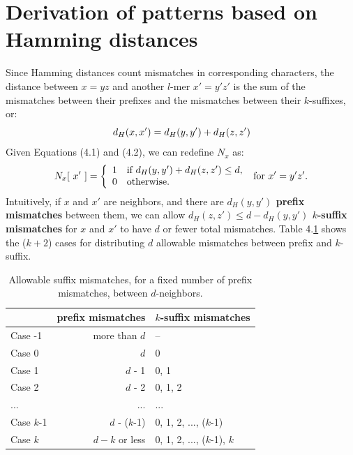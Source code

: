 \documentclass[oneside,12pt]{DISCSthesis}
\begin{document}
	\section{Derivation of patterns based on Hamming distances}
		\noindent Since Hamming distances count mismatches in corresponding characters, the distance between $x = yz$ and another $l$-mer $x' = y'z'$ is the sum of the mismatches between their prefixes and the mismatches between their $k$-suffixes, or:\vspace*{-4mm} 
		\begin{equation} d_H(x,x') = d_H(y,y') + d_H(z,z')\vspace*{-4mm}\end{equation}
		Given Equations (4.1) and (4.2), we can redefine $N_x$ as:\vspace*{-4mm}
		\begin{equation}
			N_{x}[\ x'\ ] = \left\{
			\begin{array}{rl}
				1 & \text{if } d_H(y,y') + d_H(z,z') \leq d,\\
				0 & \text{otherwise.}
			\end{array} \right.
			\text{ for }x' = y'z'.\vspace*{-4mm}	
			\end{equation}
		Intuitively, if $x$ and $x'$ are neighbors, and there are {\bf\boldmath $d_H(y,y')$  prefix mismatches} between them, we can  allow {\bf\boldmath $d_H(z,z') \leq d - d_H(y,y')$ $k$-suffix mismatches} for $x$ and $x'$ to have $d$ or fewer total mismatches. Table 4.\ref{tbl:cases_prefix_suffix} shows the ($k+2$) cases for distributing $d$ allowable mismatches between prefix and $k$-suffix. \vspace*{3mm}

		\begin{table}[h] \label{tbl:cases_prefix_suffix}
			\centering\renewcommand{\arraystretch}{1.3}
			\begin{tabular}{|l|r|l|}
			\hline
			\bfseries & \bfseries prefix mismatches & \bfseries\boldmath $k$-suffix mismatches \\
			\hline
			Case -1 &		more than $d$ 	& --\\
			Case  0 & 		$d$ 			& 0 \\
			Case  1 & 		$d$ - 1 		& 0, 1 \\
			Case  2 & 		$d$ - 2 		& 0, 1, 2 \\
			... & ...& ...\\
			Case  $k$-1 & 	$d$ - ($k$-1) 	& 0, 1, 2, ..., ($k$-1) \\
			Case  $k$ & 	$d-k$ or less 	& 0, 1, 2, ..., ($k$-1), $k$ \\
			\hline
			\end{tabular}
			\caption{Allowable suffix mismatches, for a fixed number of prefix mismatches, between $d$-neighbors.}
			\end{table}
		
\end{document}

